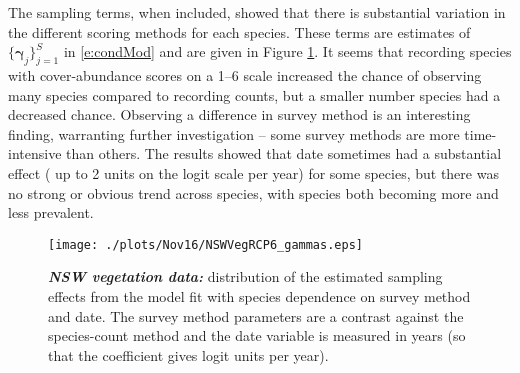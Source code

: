 \documentclass{statsoc}
\newcommand{\vg}{\bm{\gamma}}
\begin{document}
The sampling terms, when included, showed that there is substantial variation in the different scoring methods for each species. These terms are estimates of  $\{\vg_j\}_{j=1}^S$ in \eqref{e:condMod} and are given in Figure \ref{NSWVegGammas}. It seems that recording species with cover-abundance scores on a 1--6 scale increased the chance of observing many species compared to recording counts, but a smaller number species had a decreased chance. Observing a difference in survey method is an interesting finding, warranting further investigation -- some survey methods are more time-intensive than others. The results showed that date sometimes had a substantial effect ( up to 2 units on the logit scale per year) for some species, but there was no strong or obvious trend across species, with species both becoming more and less prevalent.
\begin{figure}
	\centering
	\texttt{[image: ./plots/Nov16/NSWVegRCP6\_gammas.eps]}
	\caption{\label{NSWVegGammas}\textbf{\textit{NSW vegetation data:}} distribution of the estimated sampling effects from the model fit with species dependence on survey method and date. The survey method parameters are a contrast against the species-count method and the date variable is measured in years (so that the coefficient gives logit units per year).}
\end{figure}
\end{document}
